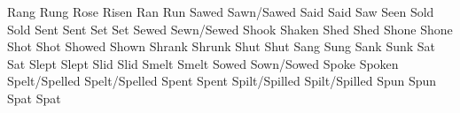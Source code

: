 	            {Rang}{}	            {Rung}{}                {}{}
	            {Rose}{}	            {Risen}{}               {}{}
	            {Ran}{}	                {Run}{}                 {}{}
	            {Sawed}{}	            {Sawn/Sawed}{}          {}{}
	            {Said}{}	            {Said}{}                {}{}
	            {Saw}{}	                {Seen}{}                {}{}
	            {Sold}{}	            {Sold}{}                {}{}
	            {Sent}{}	            {Sent}{}                {}{}
	            {Set}{}	                {Set}{}                 {}{}
	            {Sewed}{}	            {Sewn/Sewed}{}          {}{}
	            {Shook}{}	            {Shaken}{}              {}{}
	            {Shed}{}	            {Shed}{}                {}{}
	            {Shone}{}	            {Shone}{}               {}{}
	            {Shot}{}	            {Shot}{}                {}{}
	            {Showed}{}	            {Shown}{}               {}{}
	            {Shrank}{}	            {Shrunk}{}              {}{}
	            {Shut}{}	            {Shut}{}                {}{}
	            {Sang}{}	            {Sung}{}                {}{}
	            {Sank}{}	            {Sunk}{}                {}{}
	            {Sat}{}	                {Sat}{}                 {}{}
	            {Slept}{}	            {Slept}{}               {}{}
	            {Slid}{}	            {Slid}{}                {}{}
	            {Smelt}{}	            {Smelt}{}               {}{}
	            {Sowed}{}	            {Sown/Sowed}{}          {}{}
	            {Spoke}{}	            {Spoken}{}              {}{}
	            {Spelt/Spelled}{}	    {Spelt/Spelled}{}       {}{}
	            {Spent}{}	            {Spent}{}               {}{}
	            {Spilt/Spilled}{}	    {Spilt/Spilled}{}       {}{}
	            {Spun}{}	            {Spun}{}                {}{}
	            {Spat}{}	            {Spat}{}                {}{}

